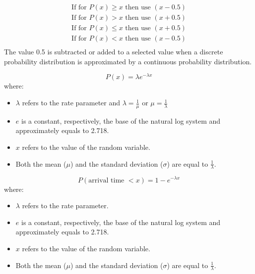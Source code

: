 \begin{equation}
\label{continuity correction factor}
\begin{aligned}
\text{If for $P(x) \geq x$ then use $(x - 0.5)$}\\
\text{If for $P(x) > x$ then use $(x + 0.5)$}\\
\text{If for $P(x) \leq x$ then use $(x + 0.5)$}\\
\text{If for $P(x) < x$ then use $(x - 0.5)$}\\
\end{aligned}
\end{equation}
The value 0.5 is subtracted or added to a selected value when a discrete probability distribution is approximated by a continuous probability distribution.
\hformbar


\begin{equation}
\label{exponential distribution}
	P(x) = \lambda e^{-\lambda x}
\end{equation}
where: 
\begin{itemize}
 \item $\lambda$ refers to the rate parameter and $\lambda = \frac{1}{\mu}$ or $\mu = \frac{1}{\lambda}$
 \item $e$ is a constant, respectively, the base of the natural log system and approximately equals to 2.718.
 \item $x$ refers to the value of the random variable.
 \item Both the mean ($\mu$) and the standard deviation ($\sigma$) are equal to $\frac{1}{\lambda}$.
\end{itemize}
\hformbar


\begin{equation}
\label{probability of exponential distribution}
P(\text{arrival time $< x$}) = 1 - e^{-\lambda x}
\end{equation}
where: 
\begin{itemize}
 \item $\lambda$ refers to the rate parameter.
 \item $e$ is a constant, respectively, the base of the natural log system and approximately equals to 2.718.
 \item $x$ refers to the value of the random variable.
 \item Both the mean ($\mu$) and the standard deviation ($\sigma$) are equal to $\frac{1}{\lambda}$.
\end{itemize}
\hformbar


